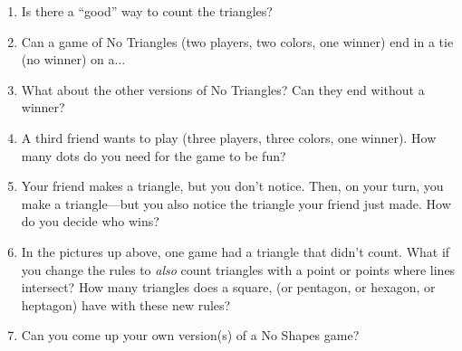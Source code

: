 \documentclass{article}
\begin{document}
\begin{enumerate}
        \item Is there a ``good'' way to count the triangles?
        \item Can a game of No Triangles (two players, two colors, one winner) end in a tie (no winner) on a...\\
        \item What about the other versions of No Triangles? Can they end without a winner?
        \item A third friend wants to play (three players, three colors, one winner). How many dots do you need for the game to be fun?
        \item Your friend makes a triangle, but you don't notice. Then, on your turn, you make a triangle---but you also notice the triangle your friend just made. How do you decide who wins?
        \item In the pictures up above, one game had a triangle that didn't count. What if you change the rules to \textit{also} count triangles with a point or points where lines intersect? How many triangles does a square, (or pentagon, or hexagon, or heptagon) have with these new rules?
        \item Can you come up your own version(s) of a No Shapes game?
    \end{enumerate}
\end{document}
